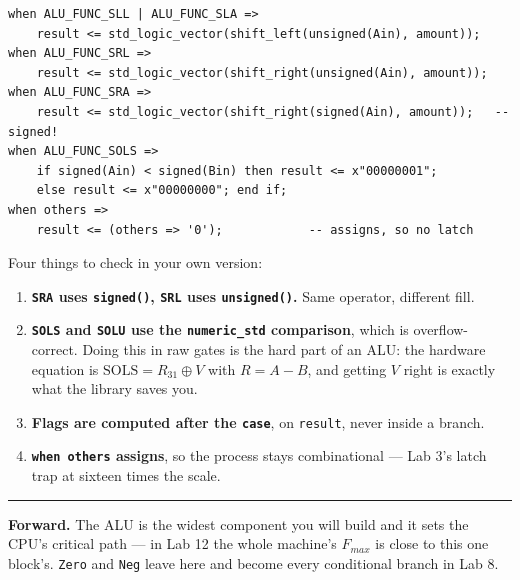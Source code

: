\documentclass[11pt]{article}
\newcommand{\code}[1]{\texttt{#1}}
\newcommand{\hr}{\vspace{2pt}\hrule\vspace{6pt}}
\begin{document}
\begin{lstlisting}
when ALU_FUNC_SLL | ALU_FUNC_SLA =>
    result <= std_logic_vector(shift_left(unsigned(Ain), amount));
when ALU_FUNC_SRL =>
    result <= std_logic_vector(shift_right(unsigned(Ain), amount));
when ALU_FUNC_SRA =>
    result <= std_logic_vector(shift_right(signed(Ain), amount));   -- signed!
when ALU_FUNC_SOLS =>
    if signed(Ain) < signed(Bin) then result <= x"00000001";
    else result <= x"00000000"; end if;
when others =>
    result <= (others => '0');            -- assigns, so no latch
\end{lstlisting}

Four things to check in your own version:

\begin{enumerate}[leftmargin=2em,itemsep=2pt]
\item \textbf{\code{SRA} uses \code{signed()}, \code{SRL} uses \code{unsigned()}.}
Same operator, different fill.
\item \textbf{\code{SOLS} and \code{SOLU} use the \code{numeric\_std} comparison},
which is overflow-correct. Doing this in raw gates is the hard part of an ALU:
the hardware equation is $\text{SOLS} = R_{31} \oplus V$ with $R = A - B$, and
getting $V$ right is exactly what the library saves you.
\item \textbf{Flags are computed after the \code{case}}, on \code{result}, never
inside a branch.
\item \textbf{\code{when others} assigns}, so the process stays combinational ---
Lab 3's latch trap at sixteen times the scale.
\end{enumerate}

\vspace{6pt}
\hr
{\small \textbf{Forward.} The ALU is the widest component you will build and it
sets the CPU's critical path --- in Lab 12 the whole machine's $F_{max}$ is close
to this one block's. \code{Zero} and \code{Neg} leave here and become every
conditional branch in Lab 8.}
\end{document}
